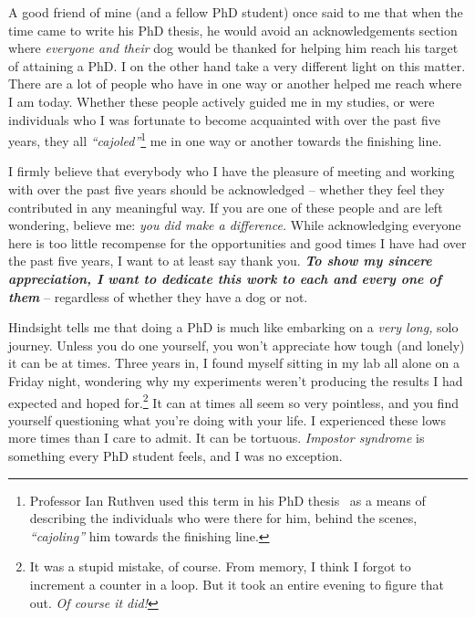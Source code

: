 

\begin{preamble}
\setcounter{footnote}{0}
{}

A good friend of mine (and a fellow PhD student) once said to me that when the time came to write his PhD thesis, he would avoid an acknowledgements section where \emph{everyone and their} dog would be thanked for helping him reach his target of attaining a PhD. I on the other hand take a very different light on this matter. There are a lot of people who have in one way or another helped me reach where I am today. Whether these people actively guided me in my studies, or were individuals who I was fortunate to become acquainted with over the past five years, they all \emph{``cajoled''}\footnote{Professor Ian Ruthven used this term in his PhD thesis~\citep{ruthven2001phd} as a means of describing the individuals who were there for him, behind the scenes, \emph{``cajoling''} him towards the finishing line.} me in one way or another towards the finishing line.

I firmly believe that everybody who I have the pleasure of meeting and working with over the past five years should be acknowledged -- whether they feel they contributed in any meaningful way. If you are one of these people and are left wondering, believe me: \emph{you did make a difference.} While acknowledging everyone here is too little recompense for the opportunities and good times I have had over the past five years, I want to at least say thank you. \textbf{\emph{To show my sincere appreciation, I want to dedicate this work to each and every one of them}} -- regardless of whether they have a dog or not.

Hindsight tells me that doing a PhD is much like embarking on a \emph{very long,} solo journey. Unless you do one yourself, you won't appreciate how tough (and lonely) it can be at times. Three years in, I found myself sitting in my lab all alone on a Friday night, wondering why my experiments weren't producing the results I had expected and hoped for.\footnote{It was a stupid mistake, of course. From memory, I think I forgot to increment a counter in a loop. But it took an entire evening to figure that out. \emph{Of course it did!}} It can at times all seem so very pointless, and you find yourself questioning what you're doing with your life. I experienced these lows more times than I care to admit. It can be tortuous. \emph{Impostor syndrome} is something every PhD student feels, and I was no exception.


\end{preamble}
